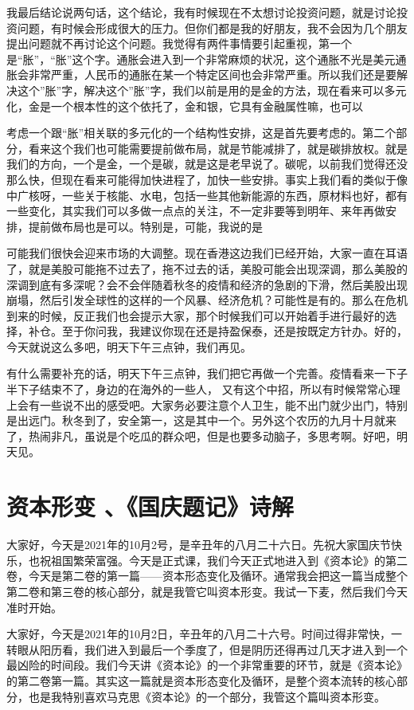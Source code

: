 \documentclass[UTF8, 12pt, a4paper]{ctexrep}
\begin{document}
我最后结论说两句话，这个结论，我有时候现在不太想讨论投资问题，就是讨论投资问题，有时候会形成很大的压力。但你们都是我的好朋友，我不会因为几个朋友提出问题就不再讨论这个问题。我觉得有两件事情要引起重视，第一个是“胀”，“胀”这个字。通胀会进入到一个非常麻烦的状况，这个通胀不光是美元通胀会非常严重，人民币的通胀在某一个特定区间也会非常严重。所以我们还是要解决这个”胀”字，解决这个”胀”字，我们以前是用的是金的方法，现在看来可以多元化，金是一个根本性的这个依托了，金和银，它具有金融属性嘛，也可以

考虑一个跟“胀”相关联的多元化的一个结构性安排，这是首先要考虑的。第二个部分，看来这个我们也可能需要提前做布局，就是节能减排了，就是碳排放权。就是我们的方向，一个是金，一个是碳，就是这是老早说了。碳呢，以前我们觉得还没那么快，但现在看来可能得加快进程了，加快一些安排。事实上我们看的类似于像中广核呀，一些关于核能、水电，包括一些其他新能源的东西，原材料也好，都有一些变化，其实我们可以多做一点点的关注，不一定非要等到明年、来年再做安排，提前做布局也是可以。特别是，可能，我说的是

可能我们很快会迎来市场的大调整。现在香港这边我们已经开始，大家一直在耳语了，就是美股可能拖不过去了，拖不过去的话，美股可能会出现深调，那么美股的深调到底有多深呢？会不会伴随着秋冬的疫情和经济的急剧的下滑，然后美股出现崩塌，然后引发全球性的这样的一个风暴、经济危机？可能性是有的。那么在危机到来的时候，反正我们也会提示大家，那个时候我们可以开始着手进行最好的选择，补仓。至于你问我，我建议你现在还是持盈保泰，还是按既定方针办。好的，今天就说这么多吧，明天下午三点钟，我们再见。

有什么需要补充的话，明天下午三点钟，我们把它再做一个完善。疫情看来一下子半下子结束不了，身边的在海外的一些人， 又有这个中招，所以有时候常常心理上会有一些说不出的感受吧。大家务必要注意个人卫生，能不出门就少出门，特别是出远门。秋冬到了，安全第一，这是其中一个。另外这个农历的九月十月就来了，热闹非凡，虽说是个吃瓜的群众吧，但是也要多动脑子，多思考啊。好吧，明天见。

\section{资本形变 、《国庆题记》诗解}

大家好，今天是2021年的10月2号，是辛丑年的八月二十六日。先祝大家国庆节快乐，也祝祖国繁荣富强。今天是正式课，我们今天正式地进入到《资本论》的第二卷，今天是第二卷的第一篇——资本形态变化及循环。通常我会把这一篇当成整个第二卷和第三卷的核心部分，就是我管它叫资本形变。我试一下麦，然后我们今天准时开始。

大家好，今天是2021年的10月2日，辛丑年的八月二十六号。时间过得非常快，一转眼从阳历看，我们进入到最后一个季度了，但是阴历还得再过几天才进入到一个最凶险的时间段。我们今天讲《资本论》的一个非常重要的环节，就是《资本论》的第二卷第一篇。其实这一篇就是资本形态变化及循环，是整个资本流转的核心部分，也是我特别喜欢马克思《资本论》的一个部分，我管这个篇叫资本形变。
\end{document}

